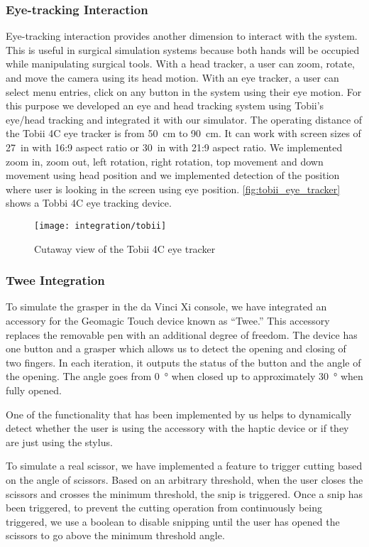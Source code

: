 \subsubsection{Eye-tracking Interaction}
Eye-tracking interaction provides another dimension to interact with the system. This is useful in surgical simulation systems because both hands will be occupied while manipulating surgical tools. With a head tracker, a user can zoom, rotate, and move the camera using its head motion. With an eye tracker, a user can select menu entries, click on any button in the system using their eye motion. For this purpose we developed an eye and head tracking system using Tobii's eye/head tracking  and integrated it with our simulator. The operating distance of the Tobii 4C eye tracker is from \SI{50}{\centi\metre} to \SI{90}{\centi\metre}. It can work with screen sizes of \SI{27}{in} with 16:9 aspect ratio or \SI{30}{in} with 21:9 aspect ratio. We implemented zoom in, zoom out, left rotation, right rotation, top movement and down movement using head position and we implemented detection of the position where user is looking in the screen using eye position. \autoref{fig:tobii_eye_tracker} shows a Tobbi 4C eye tracking device.

\begin{figure}
  \centering
  \texttt{[image: integration/tobii]}
  \caption{Cutaway view of the Tobii 4C eye tracker}\label{fig:tobii_eye_tracker}
\end{figure}

\subsubsection{Twee Integration}
To simulate the grasper in the da Vinci Xi console, we have integrated an accessory for the Geomagic Touch device known as \enquote{Twee.} This accessory replaces the removable pen with an additional degree of freedom. The device has one button and a grasper which allows us to detect the opening and closing of two fingers. In each iteration, it outputs the status of the button and the angle of the opening. The angle goes from \SI{0}{\degree} when closed up to approximately \SI{30}{\degree} when fully opened.

One of the functionality that has been implemented by us helps to dynamically detect whether the user is using the accessory with the haptic device or if they are just using the stylus.

To simulate a real scissor, we have implemented a feature to trigger cutting based on the angle of scissors. Based on an arbitrary threshold, when the user closes the scissors and crosses the minimum threshold, the snip is triggered. Once a snip has been triggered, to prevent the cutting operation from continuously being triggered, we use a boolean to disable snipping until the user has opened the scissors to go above the minimum threshold angle.

